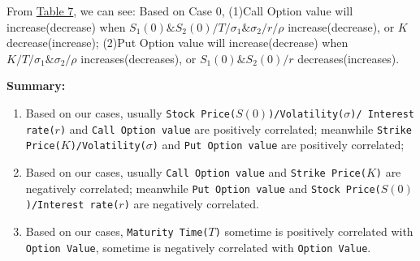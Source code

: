 \documentclass[11pt,a4paper]{article}
\begin{document}
    

    From \hyperref[T7]{Table 7}, we can see: Based on Case 0, 
    (1)Call Option value will increase(decrease) when
    $ S_1(0)\&S_2(0) /  T / \sigma_1 \& \sigma_2 / r / \rho$ 
    increase(decrease), or $ K$ decrease(increase); 
    (2)Put Option value will increase(decrease) when
    $ K / T / \sigma_1\&\sigma_2 / \rho$ increases(decreases), 
    or $ S_1(0)\&S_2(0) / r$ decreases(increases).


    \textbf{Summary:}
    \begin{enumerate}[(1)]
    \item Based on our cases, usually
    \texttt{Stock Price($S(0)$)/Volatility($\sigma$)/ 
    Interest rate($r$)}
    and \texttt{Call Option value}
    are positively correlated; meanwhile
    \texttt{Strike Price($K$)/Volatility($\sigma$)}
    and \texttt{Put Option value}
    are positively correlated;

    \item Based on our cases, usually
    \texttt{Call Option value} and 
    \texttt{Strike Price($K$)}
    are negatively correlated; meanwhile
    \texttt{Put Option value} and 
    \texttt{Stock Price($S(0)$)/Interest rate($r$)}
    are negatively correlated.

    \item Based on our cases,
    \texttt{Maturity Time($T$)} sometime is 
    positively correlated with \texttt{Option Value},
    sometime is 
    negatively correlated with \texttt{Option Value}.
    \end{enumerate}
\end{document}
